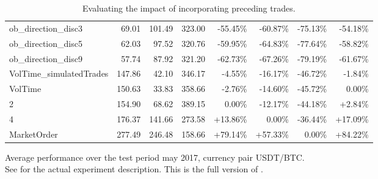 \begin{table}[ht]
{\begin{tabular}{|lRRR|RRRR|}
\midrule
ob\_direction\_disc3             &     69.01 &  101.49 &  323.00 &  -55.45\% &  -60.87\% &  -75.13\% &      -54.18\% \\
ob\_direction\_disc5             &     62.03 &   97.52 &  320.76 &  -59.95\% &  -64.83\% &  -77.64\% &      -58.82\% \\
ob\_direction\_disc9             &     57.74 &   87.92 &  321.20 &  -62.73\% &  -67.26\% &  -79.19\% &      -61.67\% \\
\midrule
VolTime\_simulatedTrades &    147.86 &   42.10 &  346.17 &   -4.55\% &  -16.17\% &  -46.72\% &       -1.84\% \\
VolTime                        &    150.63 &   33.83 &  358.66 &   -2.76\% &  -14.60\% &  -45.72\% &        0.00\% \\
2                              &    154.90 &   68.62 &  389.15 &    0.00\% &  -12.17\% &  -44.18\% &        +2.84\% \\
4                              &    176.37 &  141.66 &  273.58 &   +13.86\% &    0.00\% &  -36.44\% &       +17.09\% \\
MarketOrder                    &    277.49 &  246.48 &  158.66 &   +79.14\% &   +57.33\% &    0.00\% &      +84.22\% \\
\bottomrule
\end{tabular}}

        		\caption[Full version of .]{Evaluating the impact of incorporating preceding trades.}
		\small Average performance over the test period may 2017, currency pair USDT/BTC.\\		
		See  for the actual experiment description. This is the full version of .
		\label{tab:eval:additionalMarketVariables:simulatedTrades:fulltable}
\end{table}